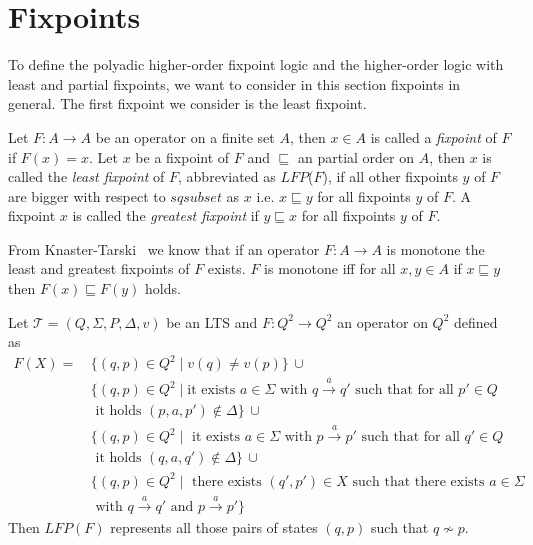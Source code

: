 
\section{Fixpoints}\label{sec:fixpoints}

To define the polyadic higher-order fixpoint logic and the higher-order logic with least and partial fixpoints, we want to consider in this section fixpoints in general. The first fixpoint we consider is the least fixpoint.

\begin{definition}
   Let $F\colon A \rightarrow A$ be an operator on a finite set $A$, then $x \in A$
   is called a \emph{fixpoint} of $F$ if $F(x) = x$. Let $x$ be a fixpoint of $F$ and $\sqsubseteq$ an partial order on $A$, then $x$ is called the \emph{least
   fixpoint} of $F$, abbreviated as $\mathit{LFP}$($F$), if all other fixpoints $y$ of $F$ are bigger with respect to $sqsubset$ as $x$ i.e. $x
   \sqsubseteq y$ for all fixpoints $y$ of $F$. A fixpoint $x$ is called the \emph{greatest fixpoint} if $y \sqsubseteq x$ for all fixpoints $y$ of $F$.
\end{definition}

From Knaster-Tarski~\cite{tarski1955lattice} we know that if an operator $F\colon A \rightarrow 
A$ is monotone the least and greatest fixpoints of $F$ exists. $F$ is monotone iff for all $x, y
 \in A$ if $x \sqsubseteq y$ then $F(x) \sqsubseteq F(y)$ holds.

\begin{example}
    \label{example:lfp} Let $\mathcal{T} = (Q, \Sigma, P, \Delta, v)$ be an LTS and $F: Q^2 \rightarrow Q^2$ an operator on $Q^2$ defined as 
\begin{align*}
    F(X) =\, &\{(q, p) \in Q^2 \mid v(q) \neq v(p)\}\, \cup \\&
    \{(q,p) \in Q^2 \mid \text{it exists } a\in\Sigma \text{ with } q\overset{a}{\rightarrow} q' \text{ such that for all } p' \in Q \\&\text{ it holds } (p, a, p')\not\in\Delta\}\,\cup \\&\{(q,p) \in Q^2 \mid  \text{ it exists } a\in\Sigma \text{ with } p\overset{a}{\rightarrow} p' \text{ such that for all } q' \in Q \\&\text{ it holds } (q, a, q')\not\in\Delta\}\,\cup \\& \{ (q, p) \in Q^2 \mid \text{ there exists } (q', p') \in X \text{ such that there exists } a\in\Sigma \\&\text{ with } q\overset{a}{\rightarrow} q' \text{ and } p\overset{a}{\rightarrow} p' \}
\end{align*}   
Then $LFP(F)$ represents all those pairs of states $(q, p)$ such that $q\not\sim p$.
\end{example}

